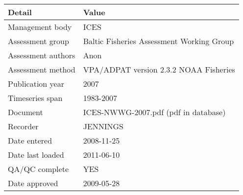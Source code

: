 \begin{table}[htb]
\centering
\begin{tabular}{lp{7cm}}
\toprule
Detail & Value \\
\midrule
Management body    & ICES                                      \\
Assessment group   & Baltic Fisheries Assessment Working Group \\
Assessment authors & Anon                                      \\
Assessment method  & VPA/ADPAT version 2.3.2 NOAA Fisheries    \\
Publication year   & 2007                                      \\
Timeseries span    & 1983-2007                                 \\
Document           & ICES-NWWG-2007.pdf (pdf in database)      \\
Recorder           & JENNINGS                                  \\
Date entered       & 2008-11-25                                \\
Date last loaded   & 2011-06-10                                \\
QA/QC complete     & YES                                       \\
Date approved      & 2009-05-28                                \\
\bottomrule
\end{tabular}
\label{tab:assessdet}
\end{table}
